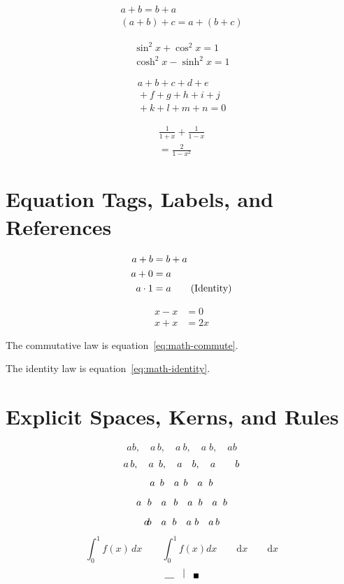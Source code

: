 \documentclass[12pt]{article}
\begin{document}
\begin{gather}
a+b=b+a \\
(a+b)+c=a+(b+c)
\end{gather}

\begin{gather*}
\sin^2x+\cos^2x=1 \\
\cosh^2x-\sinh^2x=1
\end{gather*}

\begin{multline}
a+b+c+d+e \\
{}+f+g+h+i+j \\
{}+k+l+m+n=0
\end{multline}

\begin{multline*}
\frac{1}{1+x}+\frac{1}{1-x} \\
=\frac{2}{1-x^2}
\end{multline*}

\section{Equation Tags, Labels, and References}

\begin{align}
a+b &= b+a \label{eq:math-commute} \\
a+0 &= a \notag \\
a\cdot1 &= a \tag{Identity}\label{eq:math-identity}
\end{align}

\begin{align*}
x-x &= 0 \tag*{Zero} \\
x+x &= 2x
\end{align*}

The commutative law is equation~\eqref{eq:math-commute}.

The identity law is equation~\ref{eq:math-identity}.

\section{Explicit Spaces, Kerns, and Rules}

\[
ab,\quad a\,b,\quad a\:b,\quad a\;b,\quad a\!b
\]
\[
a\thinspace b,\quad a\enspace b,\quad a\quad b,\quad a\qquad b
\]
\[
a\hspace{0.5em}b \quad a\hspace{1ex}b \quad a\hspace{6pt}b
\]
\[
a\hspace{0.5pc}b \quad a\hspace{0.1in}b
\quad a\hspace{0.2cm}b \quad a\hspace{2mm}b
\]
\[
a\hspace{-0.2em}b \quad a\hskip 6pt b \quad a\kern 3pt b \quad a\mkern 3mu b
\]
\[
\int_0^1 f(x)\,dx \qquad \int_0^1 f(x)dx
\qquad \mathrm{d}x \qquad \mathrm{d}\!x
\]
\[
\rule{1em}{0.4pt}\quad \rule{0.4pt}{1em}\quad \rule{0.5em}{0.5em}
\]
\end{document}
